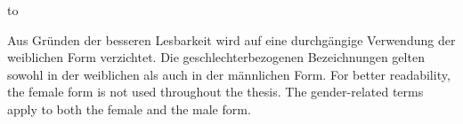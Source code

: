\newpage
\vspace*{\fill}
\hbox to \textwidth{\hrulefill}
\par
{}
  {Aus Gr\"{u}nden der besseren Lesbarkeit wird auf eine durchg\"{a}ngige Verwendung der weiblichen Form verzichtet. Die geschlechterbezogenen Bezeichnungen gelten sowohl in der weiblichen als auch in der m\"{a}nnlichen Form.}
  {For better readability, the female form is not used throughout the thesis. The gender-related terms apply to both the female and the male form.}
